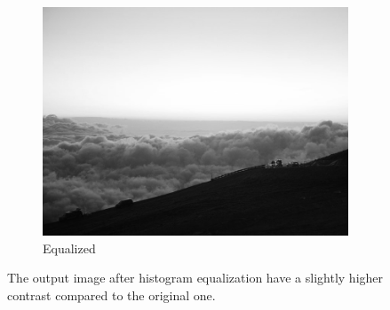 \documentclass{article}
\begin{document}
\begin{itemize}
\begin{figure}[h]
\begin{subfigure}{.45\textwidth}
        \includegraphics[width=\linewidth]{./result/labwork9-gpu-out.jpg}
        \caption{Equalized}
      \end{subfigure}
    \caption{The output image after histogram equalization have a slightly higher contrast compared to the original one.}
    \end{figure}
\end{itemize}
\end{document}
